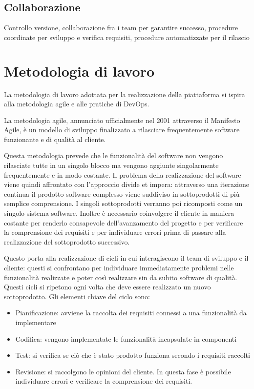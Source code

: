 \subsection{Collaborazione}
Controllo versione, collaborazione fra i team per garantire successo, procedure coordinate per sviluppo e verifica requisiti, procedure automatizzate per il rilascio


\section{Metodologia di lavoro}
La metodologia di lavoro adottata per la realizzazione della piattaforma si ispira alla metodologia agile e alle pratiche di DevOps.

La metodologia agile, annunciato ufficialmente nel 2001 attraverso il Manifesto Agile,
è un modello di sviluppo finalizzato a rilasciare frequentemente software funzionante e di qualità al cliente.

Questa metodologia prevede che le funzionalità del software non vengono rilasciate
tutte in un singolo blocco ma vengono aggiunte singolarmente frequentemente e in modo costante.
Il problema della realizzazione del software viene quindi affrontato con l'approccio divide et impera:
attraverso una iterazione continua il prodotto software complesso viene suddiviso in sottoprodotti di più semplice comprensione.
I singoli sottoprodotti verranno poi ricomposti come un singolo sistema software.
Inoltre è necessario coinvolgere il cliente in maniera costante per renderlo consapevole dell'avanzamento del progetto e per verificare la comprensione
dei requisiti e per individuare errori prima di passare alla realizzazione del sottoprodotto successivo.

Questo porta alla realizzazione di cicli in cui interagiscono il team di sviluppo e il cliente: questi si confrontano
per individuare immediatamente problemi nelle funzionalità realizzate e poter così realizzare sin da subito software di qualità.
Questi cicli si ripetono ogni volta che deve essere realizzato un nuovo sottoprodotto. Gli elementi chiave del ciclo sono:
\begin{itemize}
    \itemsep0em
    \item Pianificazione: avviene la raccolta dei requisiti connessi a una funzionalità da implementare
    \item Codifica: vengono implementate le funzionalità incapsulate in componenti
    \item Test: si verifica se ciò che è stato prodotto funziona secondo i requisiti raccolti
    \item Revisione: si raccolgono le opinioni del cliente. In questa fase è possibile individuare errori e verificare la comprensione dei requisiti.
\end{itemize}

